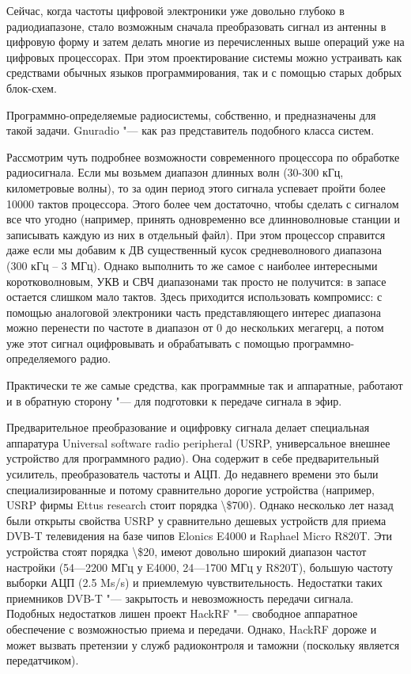 \documentclass[10pt, a5paper]{article}
\begin{document}
Сейчас, когда частоты цифровой электроники уже довольно глубоко в радиодиапазоне, стало возможным сначала преобразовать сигнал из антенны в цифровую форму и затем делать многие из перечисленных выше операций уже на цифровых процессорах. При этом проектирование системы можно устраивать как средствами обычных языков программирования, так и с помощью старых добрых блок-схем.

Программно-определяемые радиосистемы, собственно, и предназначены для такой задачи. Gnuradio "--- как раз представитель подобного класса систем.

Рассмотрим чуть подробнее возможности современного процессора по обработке радиосигнала. Если мы возьмем диапазон длинных волн (30-300 кГц, километровые волны), то за один период этого сигнала успевает пройти более 10000 тактов процессора. Этого более чем достаточно, чтобы сделать с сигналом все что угодно (например, принять одновременно все длинноволновые станции и записывать каждую из них в отдельный файл). При этом процессор справится даже если мы добавим к ДВ существенный кусок средневолнового диапазона (300 кГц -- 3 МГц). Однако выполнить то же самое с наиболее интересными коротковолновым, УКВ и СВЧ диапазонами так просто не получится: в запасе остается слишком мало тактов. Здесь приходится использовать компромисс: с помощью аналоговой электроники часть представляющего интерес диапазона можно перенести по частоте в диапазон от 0 до нескольких мегагерц, а потом уже этот сигнал оцифровывать и обрабатывать с помощью программно-определяемого радио.

Практически те же самые средства, как программные так и аппаратные, работают и в обратную сторону "--- для подготовки к передаче сигнала в эфир.

Предварительное преобразование и оцифровку сигнала делает специальная аппаратура Universal software radio peripheral (USRP, универсальное внешнее устройство для программного радио). Она содержит в себе предварительный усилитель, преобразователь частоты и АЦП. До недавнего времени это были специализированные и потому сравнительно дорогие устройства (например, USRP фирмы Ettus research стоит порядка \textbackslash{}\$700). Однако несколько лет назад были открыты свойства USRP у сравнительно дешевых устройств для приема DVB-T телевидения на базе чипов Elonics E4000 и Raphael Micro R820T. Эти устройства стоят порядка \textbackslash{}\$20, имеют довольно широкий диапазон частот настройки (54---2200 МГц у E4000, 24---1700 МГц у R820T), большую частоту выборки АЦП (2.5 Ms/s) и приемлемую чувствительность. Недостатки таких приемников DVB-T "--- закрытость и невозможность передачи сигнала. Подобных недостатков лишен проект HackRF "--- свободное аппаратное обеспечение с возможностью приема и передачи. Однако, HackRF дороже и может вызвать претензии у служб радиоконтроля и таможни (поскольку является передатчиком).
\end{document}
